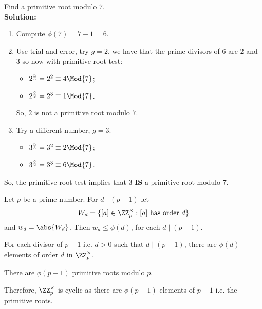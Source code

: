 \documentclass[12pt, a4paper]{article}
\begin{document}
\begin{example}
    Find a primitive root modulo \(7\). \\
    \textbf{Solution:} 
    \begin{enumerate}
        \item Compute \(\phi(7)=7-1=6\).
        \item Use trial and error, try \(g=2\), we have that the prime divisors of \(6\) are \(2\) and \(3\) so now with primitive root test:
        \begin{itemize}
            \item \(2^{\frac{6}{3}}= 2^2 \equiv 4 \Mod{7}\);
            \item \(2^{\frac{6}{2}} =2^3 \equiv 1 \Mod{7}\).
        \end{itemize}
        So, \(2\) is not a primitive root modulo \(7\).
        \item Try a different number, \(g=3\).
        \begin{itemize}
            \item \(3^{\frac{6}{3}}= 3^2 \equiv 2 \Mod{7}\);
            \item \(3^{\frac{6}{2}} =3^3 \equiv 6 \Mod{7}\).
        \end{itemize}
    \end{enumerate}
    So, the primitive root test implies that \(3\) \textbf{IS} a primitive root modulo \(7\).
\end{example}

\begin{lemma}
    Let \(p\) be a prime number. For \(d\mid (p-1)\) let 
    \[W_d =\{[a] \in \ZZ_p^{\times} : [a] \text{ has order } d\}\]
    and \(w_d = \abs{W_d}\). Then \(w_d \leq \phi(d)\), for each \(d \mid (p-1)\).
\end{lemma}

\begin{theorem}
    For each divisor of \(p-1\) i.e. \(d>0\) such that \(d\mid (p-1)\), there are \(\phi(d)\) elements of order \(d\) in \(\ZZ_p^{\times}\).
\end{theorem}

\begin{mdcor}
    There are \(\phi(p-1)\) primitive roots modulo \(p\).
\end{mdcor}

\begin{mdremark}
    Therefore, \(\ZZ_p^{\times}\) is cyclic as there are \(\phi(p-1)\) elements of \(p-1\) i.e. the primitive roots.
\end{mdremark}
\end{document}
